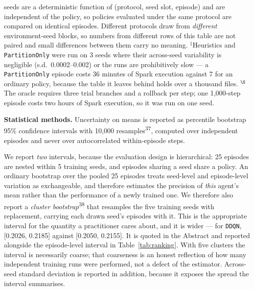 \documentclass[fleqn,10pt]{wlscirep}
\newcommand{\ddqn}{\texttt{DDQN}}
\begin{document}
\begin{table}[!htbp]
{  seeds are a deterministic function of (protocol, seed slot, episode)
  and are independent of the policy, so policies evaluated under the same
  protocol are compared on identical episodes.
  Different protocols draw from \emph{different} environment-seed
  blocks, so numbers from different rows of this table are not paired
  and small differences between them carry no meaning.
  $^{\ddagger}$Heuristics and \texttt{PartitionOnly} were run on 3 seeds
  where their across-seed variability is negligible (s.d.\ 0.0002--0.002)
  or the runs are prohibitively slow --- a \texttt{PartitionOnly} episode
  costs 36 minutes of Spark execution against 7 for an ordinary policy,
  because the table it leaves behind holds over a thousand files. $^{\S}$The oracle requires three
  trial branches and a rollback per step; one 1{,}000-step episode costs
  two hours of Spark execution, so it was run on one seed.}
\end{table}

\textbf{Statistical methods.}
Uncertainty on means is reported as percentile bootstrap 95\% confidence
intervals with 10{,}000 resamples\textsuperscript{37}, computed over
independent episodes and never over autocorrelated within-episode steps.

We report \emph{two} intervals, because the evaluation design is
hierarchical: 25 episodes are nested within 5 training seeds, and
episodes sharing a seed share a policy. An ordinary bootstrap over the
pooled 25 episodes treats seed-level and episode-level variation as
exchangeable, and therefore estimates the precision of \emph{this}
agent's mean rather than the performance of a newly trained one. We
therefore also report a \emph{cluster
bootstrap}\textsuperscript{38} that resamples the five training
seeds with replacement, carrying each drawn seed's episodes
with it. This is the appropriate interval for the quantity a
practitioner cares about, and it is wider --- for \ddqn{},
[0.2026, 0.2185] against [0.2050, 0.2155]. It is quoted in the Abstract
and reported alongside the episode-level interval in
Table~\ref{tab:ranking}. With five clusters the interval is necessarily
coarse; that coarseness is an honest reflection of how many independent
training runs were performed, not a defect of the estimator. Across-seed
standard deviation is reported in addition, because it exposes the
spread the interval summarises.
\end{document}
